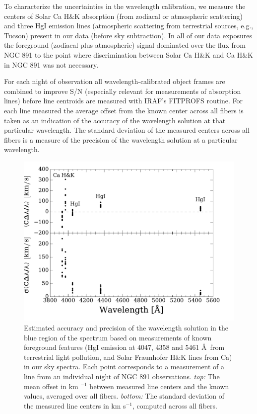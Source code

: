 To characterize the uncertainties in the wavelength calibration, we
measure the centers of Solar Ca H\&K absorption (from zodiacal or
atmospheric scattering) and three HgI emission lines (atmospheric
scattering from terrestrial sources, e.g., Tucson) present in our data
(before sky subtraction). In all of our data exposures the foreground
(zodiacal plus atmospheric) signal dominated over the flux from NGC
891 to the point where discrimination between Solar Ca H\&K and Ca
H\&K in NGC 891 was not necessary.

For each night of observation all wavelength-calibrated object frames
are combined to improve S/N (especially relevant for measurements of
absorption lines) before line centroids are measured with IRAF's
FITPROFS routine. For each line measured the average offset from the
known center across all \GP fibers is taken as an indication of the
accuracy of the wavelength solution at that particular wavelength. The
standard deviation of the measured centers across all \GP fibers is a
measure of the precision of the wavelength solution at a particular
wavelength.

\begin{figure}
  \centering
  \includegraphics[width=\columnwidth]{891_1/figs/Wave_Err_comb.pdf}
  \caption[Accuracy and precision of wavelength
  calibration]{\label{891_1:fig:wave_err}\fixspacing Estimated accuracy and
    precision of the wavelength solution in the blue region of the
    spectrum based on measurements of known foreground features (HgI
    emission at 4047, 4358 and 5461 \AA\ from terrestrial light
    pollution, and Solar Fraunhofer H\&K lines from Ca) in our sky
    spectra.  Each point corresponds to a measurement of a line from
    an individual night of NGC 891 observations. \emph{top:} The mean
    offset in km $^{-1}$ between measured line centers and the known
    values, averaged over all \GP fibers. \emph{bottom:} The standard
    deviation of the measured line centers in km s$^{-1}$, computed
    across all \GP fibers.}
\end{figure}

